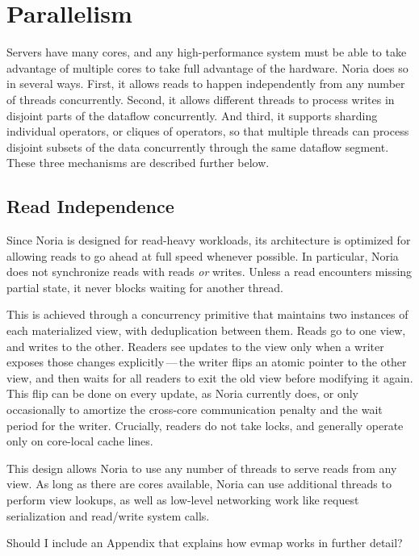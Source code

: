 \section{Parallelism}

Servers have many cores, and any high-performance system must be able to take
advantage of multiple cores to take full advantage of the hardware. Noria does
so in several ways. First, it allows reads to happen independently from any
number of threads concurrently. Second, it allows different threads to process
writes in disjoint parts of the dataflow concurrently. And third, it supports
sharding individual operators, or cliques of operators, so that multiple threads
can process disjoint subsets of the data concurrently through the same dataflow
segment. These three mechanisms are described further below.

\subsection{Read Independence}

Since Noria is designed for read-heavy workloads, its architecture is optimized
for allowing reads to go ahead at full speed whenever possible. In particular,
Noria does not synchronize reads with reads \emph{or} writes. Unless a read
encounters missing partial state, it never blocks waiting for another thread.

This is achieved through a concurrency primitive that maintains two instances of
each materialized view, with deduplication between them. Reads go to one view,
and writes to the other. Readers see updates to the view only when a writer
exposes those changes explicitly\,---\,the writer flips an atomic pointer to the
other view, and then waits for all readers to exit the old view before modifying
it again. This flip can be done on every update, as Noria currently does, or
only occasionally to amortize the cross-core communication penalty and the wait
period for the writer. Crucially, readers do not take locks, and generally
operate only on core-local cache lines.

This design allows Noria to use any number of threads to serve reads from any
view. As long as there are cores available, Noria can use additional threads to
perform view lookups, as well as low-level networking work like request
serialization and read/write system calls.

\begin{inprogress}
  Should I include an Appendix that explains how evmap works in further detail?
\end{inprogress}


